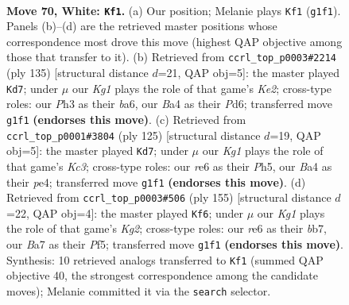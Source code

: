 \documentclass[11pt]{article}
\begin{document}
\clearpage

\begin{figure}[p]\centering
\begin{subfigure}{0.46\textwidth}\centering
\resizebox{\linewidth}{!}{%
\newchessgame
\chessboard[
  setfen={2R5/B6k/4r3/8/B3p2p/5p1P/b4P2/6K1 w - - 50 70},
  showmover=false,
  pgfstyle=straightmove, color=movearrow, markmove={g1-f1}
]}
\caption{}
\end{subfigure}\hfill
\begin{subfigure}{0.46\textwidth}\centering
\resizebox{\linewidth}{!}{%
\newchessgame
\chessboard[
  setfen={8/4k3/B2p1p2/p4P1K/4P3/1P6/P7/4b3 b - - 30 68},
  showmover=false,
  pgfstyle=straightmove, color=movearrow, markmove={e7-d7}
]}
\caption{}
\end{subfigure}
\\[4pt]
\begin{subfigure}{0.46\textwidth}\centering
\resizebox{\linewidth}{!}{%
\newchessgame
\chessboard[
  setfen={8/8/p1k2K2/1p5p/1P2PBb1/P7/7P/8 b - - 14 63},
  showmover=false,
  pgfstyle=straightmove, color=movearrow, markmove={c6-d7}
]}
\caption{}
\end{subfigure}\hfill
\begin{subfigure}{0.46\textwidth}\centering
\resizebox{\linewidth}{!}{%
\newchessgame
\chessboard[
  setfen={8/1B3pk1/8/5p1p/1b3P1P/1P4P1/4K3/8 b - - 20 78},
  showmover=false,
  pgfstyle=straightmove, color=movearrow, markmove={g7-f6}
]}
\caption{}
\end{subfigure}
\caption{\textbf{Move 70, White: \texttt{Kf1}.} (a) Our position; Melanie plays \texttt{Kf1} (\texttt{g1f1}). Panels (b)--(d) are the retrieved master positions whose correspondence most drove this move (highest QAP objective among those that transfer to it). (b) Retrieved from \texttt{ccrl\_top\_p0003\#2214} (ply 135) [structural distance $d$=21, QAP obj=5]: the master played \texttt{Kd7}; under $\mu$ our \emph{Kg1} plays the role of that game's \emph{Ke2}; cross-type roles: our \emph{P}h3 as their \emph{b}a6, our \emph{B}a4 as their \emph{P}d6; transferred move \texttt{g1f1} \textbf{(endorses this move)}. (c) Retrieved from \texttt{ccrl\_top\_p0001\#3804} (ply 125) [structural distance $d$=19, QAP obj=5]: the master played \texttt{Kd7}; under $\mu$ our \emph{Kg1} plays the role of that game's \emph{Kc3}; cross-type roles: our \emph{r}e6 as their \emph{P}h5, our \emph{B}a4 as their \emph{p}e4; transferred move \texttt{g1f1} \textbf{(endorses this move)}. (d) Retrieved from \texttt{ccrl\_top\_p0003\#506} (ply 155) [structural distance $d$=22, QAP obj=4]: the master played \texttt{Kf6}; under $\mu$ our \emph{Kg1} plays the role of that game's \emph{Kg2}; cross-type roles: our \emph{r}e6 as their \emph{b}b7, our \emph{B}a7 as their \emph{P}f5; transferred move \texttt{g1f1} \textbf{(endorses this move)}. Synthesis: 10 retrieved analogs transferred to \texttt{Kf1} (summed QAP objective 40, the strongest correspondence among the candidate moves); Melanie committed it via the \texttt{search} selector.}
\label{fig:thought-m138}
\end{figure}
\end{document}
